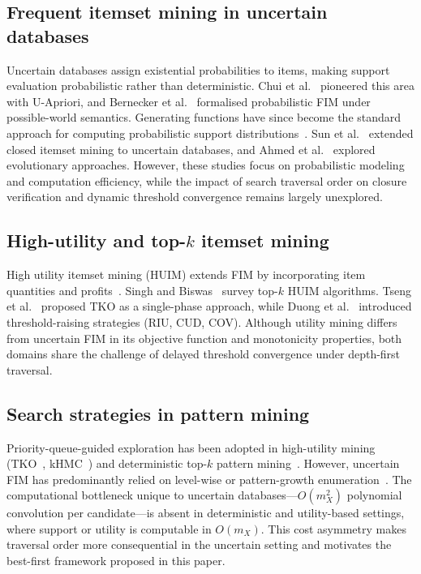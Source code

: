\documentclass[10pt,letterpaper]{article}
\begin{document}
\subsection*{Frequent itemset mining in uncertain databases}

Uncertain databases assign existential probabilities to items, making support
evaluation probabilistic rather than deterministic. Chui et al.~\cite{bib13}
pioneered this area with U-Apriori, and Bernecker et al.~\cite{bib3} formalised
probabilistic FIM under possible-world semantics. Generating functions have since
become the standard approach for computing probabilistic support
distributions~\cite{bib14}. Sun et al.~\cite{bib14} extended closed itemset mining
to uncertain databases, and Ahmed et al.~\cite{bib15} explored evolutionary
approaches. However, these studies focus on probabilistic modeling and computation
efficiency, while the impact of search traversal order on closure verification and
dynamic threshold convergence remains largely unexplored.

\subsection*{High-utility and top-$k$ itemset mining}

High utility itemset mining (HUIM) extends FIM by incorporating item quantities and
profits~\cite{bib7}. Singh and Biswas~\cite{bib16} survey top-$k$ HUIM algorithms.
Tseng et al.~\cite{bib17} proposed TKO as a single-phase approach, while Duong et
al.~\cite{bib18} introduced threshold-raising strategies (RIU, CUD, COV). Although
utility mining differs from uncertain FIM in its objective function and monotonicity
properties, both domains share the challenge of delayed threshold convergence under
depth-first traversal.

\subsection*{Search strategies in pattern mining}

Priority-queue-guided exploration has been adopted in high-utility mining
(TKO~\cite{bib17}, kHMC~\cite{bib18}) and deterministic top-$k$ pattern
mining~\cite{bib6}. However, uncertain FIM has predominantly relied on level-wise
or pattern-growth enumeration~\cite{bib13,bib14}. The computational bottleneck
unique to uncertain databases---$O(m_X^2)$ polynomial convolution per candidate---is
absent in deterministic and utility-based settings, where support or utility is
computable in $O(m_X)$. This cost asymmetry makes traversal order more consequential
in the uncertain setting and motivates the best-first framework proposed in this
paper.
\end{document}
